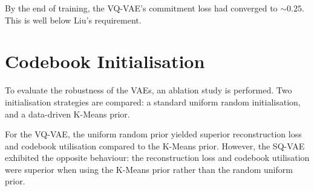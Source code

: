 By the end of training, the VQ-VAE's commitment loss had converged to $\sim 0.25$.
This is well below Liu's requirement.

\section{Codebook Initialisation}
\label{sec:vae-ablation.2}




To evaluate the robustness of the VAEs, an ablation study is performed.
Two initialisation strategies are compared:
a standard uniform random initialisation,
and a data-driven K-Means prior.

For the VQ-VAE, the uniform random prior yielded superior reconstruction loss and codebook utilisation compared to the K-Means prior.
However, the SQ-VAE exhibited the opposite behaviour: the reconstruction loss and codebook utilisation were superior when using the K-Means prior rather than the random uniform prior.

